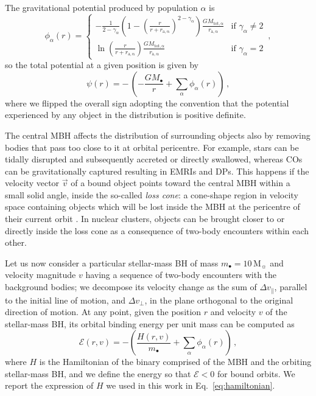 \documentclass[desactivate]{aa}
\begin{document}
        The gravitational potential produced by population $\alpha$ is \citep{1993MNRAS.265..250D,1994AJ....107..634T}
        \begin{equation} \label{eq:phi}
            \phi_\alpha (r) =
                \begin{cases}
                    \displaystyle - \frac{1}{2-\gamma_\alpha} \left(1- \left( \frac{r}{r+r_\mathrm{a,\alpha}}\right)^{2-\gamma_\alpha}\right) \frac{GM_\mathrm{tot,\alpha}}{r_\mathrm{a,\alpha}} & \text{if } \gamma_\alpha \neq 2 \\
                    \displaystyle \ln{\left(\frac{r}{r+r_\mathrm{a,\alpha}}\right)} \frac{GM_\mathrm{tot,\alpha}}{r_\mathrm{a,\alpha}} & \text{if } \gamma_\alpha = 2
                \end{cases} \, ,
        \end{equation}
        so the total potential at a given position is given by
        \begin{equation} \label{eq:psi}
            \psi (r) = - \, \left( - \frac{GM_\bullet}{r} + \sum_\alpha \phi_\alpha (r) \right) \, ,
        \end{equation}
        where we flipped the overall sign adopting the convention that the potential experienced by any object in the distribution is positive definite.

        The central MBH affects the distribution of surrounding objects also by removing bodies that pass too close to it at orbital pericentre. For example, stars can be tidally disrupted and subsequently accreted or directly swallowed, whereas COs can be gravitationally captured resulting in EMRIs and DPs. 
        This happens if the velocity vector $\vec{v}$ of a bound object points toward the central MBH within a small solid angle, inside the so-called \textit{loss cone}: a cone-shape region in velocity space containing objects which will be lost inside the MBH at the pericentre of their current orbit \citep[see][]{2017ARA&A..55...17A,2018LRR....21....4A}. In nuclear clusters, objects can be brought closer to or directly inside the loss cone as a consequence of two-body encounters within each other. 

        Let us now consider a particular stellar-mass BH of mass $m_\bullet = 10 \, \mathrm{M_\sun}$ and velocity magnitude $v$ having a sequence of two-body encounters with the background bodies; we decompose its velocity change as the sum of $\Delta v_\parallel$, parallel to the initial line of motion, and $\Delta v_\perp$, in the plane orthogonal to the original direction of motion. At any point, given the position $r$ and velocity $v$ of the stellar-mass BH, its orbital binding energy per unit mass can be computed as
        \begin{equation}
            \mathcal{E} (r,v) = - \left( \frac{H (r,v)}{m_\bullet} + \sum_\alpha \phi_\alpha (r) \right) \, ,
        \end{equation}
        where $H$ is the Hamiltonian of the binary comprised of the MBH and the orbiting stellar-mass BH, and we define the energy so that $\mathcal{E} < 0$ for bound orbits. We report the expression of $H$ we used in this work in Eq.\ \eqref{eq:hamiltonian}.
        
\end{document}
